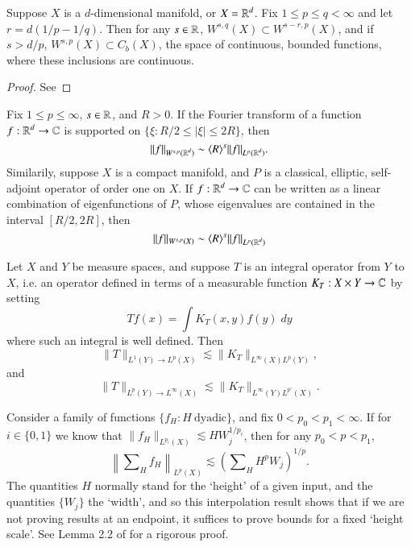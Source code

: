 \begin{theorem}
    Suppose $X$ is a $d$-dimensional manifold, or $X = \operatorname{\mathbb{R}}^d$. Fix $1 \leq p \leq q < \infty$ and let $r = d(1/p - 1/q)$. Then for any $s \in \operatorname{\mathbb{R}}$, $W^{s,q}(X) \subset W^{s-r,p}(X)$, and if $s > d/p$, $W^{s,p}(X) \subset C_b(X)$, the space of continuous, bounded functions, where these inclusions are continuous.
\end{theorem}
\begin{proof}
    See 
\end{proof}

\begin{theorem}
    Fix $1 \leq p \leq \infty$, $s \in \operatorname{\mathbb{R}}$, and $R > 0$. If the Fourier transform of a function $f: \operatorname{\mathbb{R}}^d \to \operatorname{\mathbb{C}}$ is supported on $\{ \xi : R/2 \leq |\xi| \leq 2R \}$, then
    \[ \| f \|_{W^{s,p}(\operatorname{\mathbb{R}}^d)} \sim \langle R \rangle^s \| f \|_{L^p(\operatorname{\mathbb{R}}^d)}. \]%
    Similarily, suppose $X$ is a compact manifold, and $P$ is a classical, elliptic, self-adjoint operator of order one on $X$. If $f: \operatorname{\mathbb{R}}^d \to \operatorname{\mathbb{C}}$ can be written as a linear combination of eigenfunctions of $P$, whose eigenvalues are contained in the interval $[R/2,2R]$, then
        \[ \| f \|_{W^{s,p}(X)} \sim \langle R \rangle^s \| f \|_{L^p(\operatorname{\mathbb{R}}^d)} \]
\end{theorem}

\begin{theorem}
    Let $X$ and $Y$ be measure spaces, and suppose $T$ is an integral operator from $Y$ to $X$, i.e. an operator defined in terms of a measurable function $K_T: X \times Y \to \operatorname{\mathbb{C}}$ by setting
    \[ Tf(x) = \int K_T(x,y) f(y)\; dy \]
    where such an integral is well defined. Then
    \[ \| T \|_{L^1(Y) \to L^p(X)} \lesssim \| K_T \|_{L^\infty(X) L^p(Y)}, \]
    and
    \[ \| T \|_{L^p(Y) \to L^\infty(X)} \lesssim \| K_T \|_{L^\infty(Y) L^{p'}(X)}. \]
\end{theorem}

\begin{theorem}
    Consider a family of functions $\{ f_H: H\ \text{dyadic} \}$, and fix $0 < p_0 < p_1 < \infty$. If for $i \in \{ 0,1 \}$ we know that $\| f_H \|_{L^{p_i}(X)} \lesssim H W_j^{1/p_i}$, then for any $p_0 < p < p_1$,
    \[ \left\| \sum\nolimits_H f_H \right\|_{L^p(X)} \lesssim \left( \sum\nolimits_H H^p W_j \right)^{1/p}. \]
    The quantities $H$ normally stand for the `height' of a given input, and the quantities $\{ W_j \}$ the `width', and so this interpolation result shows that if we are not proving results at an endpoint, it suffices to prove bounds for a fixed `height scale'. See Lemma 2.2 of \cite{HeoandNazarovandSeeger} for a rigorous proof.
\end{theorem}
    

